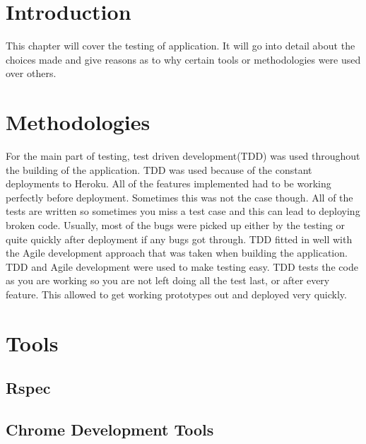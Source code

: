\section{Introduction}
This chapter will cover the testing of application. It will go into detail about the choices made and give reasons as to why certain tools or methodologies were used over others.\\

\section{Methodologies}
For the main part of testing, test driven development(TDD) was used throughout the building of the application. TDD was used because of the constant deployments to Heroku. All of the features implemented had to be working perfectly before deployment. Sometimes this was not the case though. All of the tests are written so sometimes you miss a test case and this can lead to deploying broken code. Usually, most of the bugs were picked up either by the testing or quite quickly after deployment if any bugs got through. TDD fitted in well with the Agile development approach that was taken when building the application. TDD and Agile development were used to make testing easy. TDD tests the code as you are working so you are not left doing all the test last, or after every feature. This allowed to get working prototypes out and deployed very quickly.\\

\section{Tools}
\subsection{Rspec}
\subsection{Chrome Development Tools}